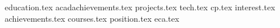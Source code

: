 \documentclass[11pt, a4paper]{awesome-cv}
\newcommand*{\sectiondir}{resume/}
\begin{document}
\makecvheader

{education.tex}
{acadachievements.tex}
{projects.tex}
{tech.tex}
{cp.tex}
\clearpage
{interest.tex}
{achievements.tex}
{courses.tex}
{position.tex}
{eca.tex}
\end{document}
